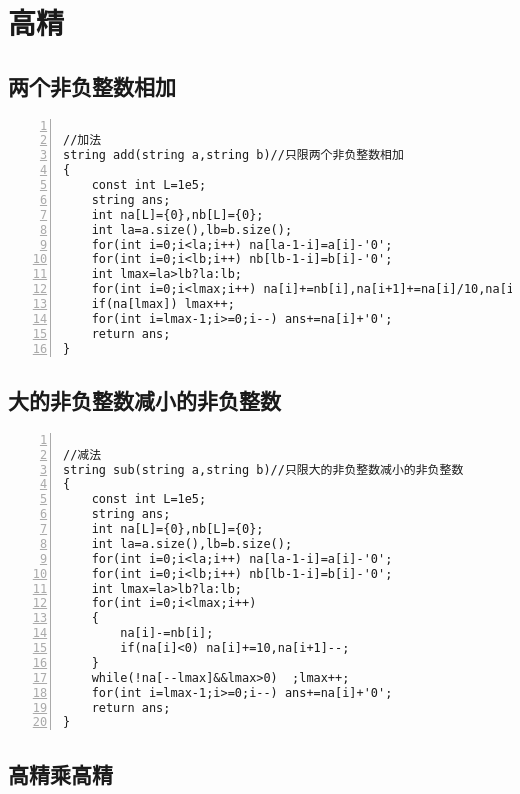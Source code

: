  
 
 
 \title{}
 \author{}
 \date{}
 
 
\maketitle
\tableofcontents
\newpage

\section{高精}
\subsection{两个非负整数相加}

\begin{lstlisting}[language={[ANSI]C},numbers=left]

//加法
string add(string a,string b)//只限两个非负整数相加
{
    const int L=1e5;
    string ans;
    int na[L]={0},nb[L]={0};
    int la=a.size(),lb=b.size();
    for(int i=0;i<la;i++) na[la-1-i]=a[i]-'0';
    for(int i=0;i<lb;i++) nb[lb-1-i]=b[i]-'0';
    int lmax=la>lb?la:lb;
    for(int i=0;i<lmax;i++) na[i]+=nb[i],na[i+1]+=na[i]/10,na[i]%=10;
    if(na[lmax]) lmax++;
    for(int i=lmax-1;i>=0;i--) ans+=na[i]+'0';
    return ans;
}
\end{lstlisting}

\subsection{大的非负整数减小的非负整数}


\begin{lstlisting}[language={[ANSI]C},numbers=left]

//减法
string sub(string a,string b)//只限大的非负整数减小的非负整数
{
    const int L=1e5;
    string ans;
    int na[L]={0},nb[L]={0};
    int la=a.size(),lb=b.size();
    for(int i=0;i<la;i++) na[la-1-i]=a[i]-'0';
    for(int i=0;i<lb;i++) nb[lb-1-i]=b[i]-'0';
    int lmax=la>lb?la:lb;
    for(int i=0;i<lmax;i++)
    {
        na[i]-=nb[i];
        if(na[i]<0) na[i]+=10,na[i+1]--;
    }
    while(!na[--lmax]&&lmax>0)  ;lmax++;
    for(int i=lmax-1;i>=0;i--) ans+=na[i]+'0';
    return ans;
}
\end{lstlisting}

\subsection{高精乘高精}


